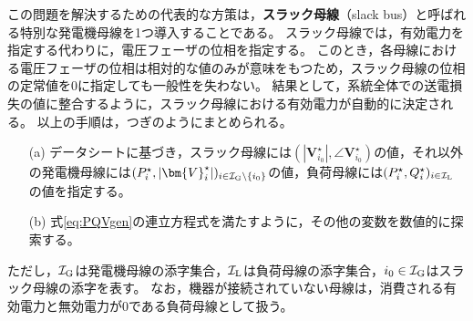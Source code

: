\documentclass[tombow,dvipdfmx]{corona-a5-1.1}
\begin{document}
この問題を解決するための代表的な方策は，\textbf{スラック母線}（slack bus）と呼ばれる特別な発電機母線を1つ導入することである。
スラック母線では，有効電力を指定する代わりに，電圧フェーザの位相を指定する。
このとき，各母線における電圧フェーザの位相は相対的な値のみが意味をもつため，スラック母線の位相の定常値を0に指定しても一般性を失わない。
結果として，系統全体での送電損失の値に整合するように，スラック母線における有効電力が自動的に決定される。
以上の手順は，つぎのようにまとめられる。
\begin{itemize}
\item[(a)] データシートに基づき，スラック母線には$(|\bm{V}_{i_0}^{\star}|,\angle \bm{V}_{i_0}^{\star})$の値，それ以外の発電機母線には$(P_i^{\star},|\bm{V}_{i}^{\star}|)_{i \in \mathcal{I}_{\rm G}\setminus\{i_0\} }$の値，負荷母線には$(P_i^{\star},Q_i^{\star})_{i \in \mathcal{I}_{\rm L}}$の値を指定する。
\item[(b)] 式\ref{eq:PQVgen}の連立方程式を満たすように，その他の変数を数値的に探索する。
\end{itemize}
ただし，$\mathcal{I}_{\rm G}$は発電機母線の添字集合，$\mathcal{I}_{\rm L}$は負荷母線の添字集合，$i_0 \in \mathcal{I}_{\rm G}$はスラック母線の添字を表す。
なお，機器が接続されていない母線は，消費される有効電力と無効電力が0である負荷母線として扱う。

%
\end{document}
